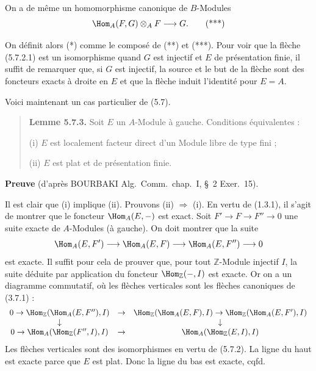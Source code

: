 On a de même un homomorphisme canonique de $B$-Modules
\[
\Hom_A(F, G) \otimes_A F \longrightarrow G. \tag{***}
\]

On définit alors (*) comme le composé de (**) et (***). Pour voir que la flèche (5.7.2.1) est un isomorphisme quand $G$ est injectif et $E$ de présentation finie, il suffit de remarquer que, si $G$ est injectif, la source et le but de la flèche sont des foncteurs exacts à droite en $E$ et que la flèche induit l'identité pour $E = A$.

Voici maintenant un cas particulier de (5.7).

\begin{quote}
\textbf{Lemme 5.7.3.} Soit $E$ un $A$-Module à gauche. Conditions équivalentes :

(i) $E$ est localement facteur direct d'un Module libre de type fini ;

(ii) $E$ est plat et de présentation finie.
\end{quote}

\textbf{Preuve} (d'après BOURBAKI Alg.\ Comm.\ chap.\ I, \S\ 2 Exer.\ 15).

Il est clair que (i) implique (ii). Prouvons (ii) $\Rightarrow$ (i). En vertu de (1.3.1), il s'agit de montrer que le foncteur $\Hom_A(E, -)$ est exact. Soit $F' \to F \to F'' \to 0$ une suite exacte de $A$-Modules (à gauche). On doit montrer que la suite
\[
\Hom_A(E, F') \longrightarrow \Hom_A(E, F) \longrightarrow \Hom_A(E, F'') \longrightarrow 0
\]
est exacte. Il suffit pour cela de prouver que, pour tout $\mathbb{Z}$-Module injectif $I$, la suite déduite par application du foncteur $\Hom_{\mathbb{Z}}(-, I)$ est exacte. Or on a un diagramme commutatif, où les flèches verticales sont les flèches canoniques de (3.7.1) :
\[
\begin{array}{ccc}
0 \to \Hom_{\mathbb{Z}}(\Hom_A(E, F''), I) & \to & \Hom_{\mathbb{Z}}(\Hom_A(E, F), I) \to \Hom_{\mathbb{Z}}(\Hom_A(E, F'), I) \\
\downarrow & & \downarrow \\
0 \to \Hom_A(\Hom_{\mathbb{Z}}(F'', I), I) & \to & \Hom_A(\Hom_{\mathbb{Z}}(E, I), I)
\end{array}
\]
Les flèches verticales sont des isomorphismes en vertu de (5.7.2). La ligne du haut est exacte parce que $E$ est plat. Donc la ligne du bas est exacte, cqfd.

